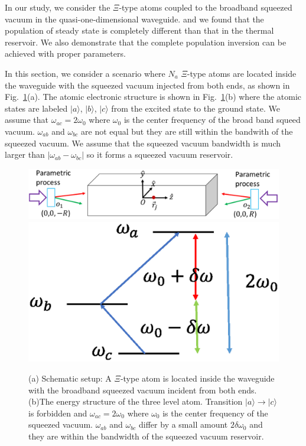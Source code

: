 \documentclass[aps,showpacs,twocolumn,twoside,groupedaddress]{revtex4}
\begin{document}
In our study, we consider the $\Xi$-type atoms coupled to the broadband squeezed vacuum in the quasi-one-dimensional waveguide. and we found that the population of steady state is completely different than that in the thermal reservoir. We also demonstrate that the complete population inversion can be achieved with proper parameters.


In this section, we consider a scenario where $N_a$ $\Xi$-type atoms are located inside the waveguide with the squeezed vacuum injected from both ends, as shown in Fig.~\ref{1}(a). The atomic electronic structure is shown in Fig.~\ref{1}(b) where the atomic states are labeled $|a\rangle$, $|b\rangle$, $|c\rangle$ from the excited state to the ground state. We assume that $\omega_{ac}=2\omega_0$ where $\omega_0$ is the center frequency of the broad band squeed vacuum.  $\omega_{ab}$ and $\omega_{bc}$ are not equal but they are still within the bandwith of the squeezed vacuum. We assume that the squeezed vacuum bandwidth is much larger than $|\omega_{ab}-\omega_{bc}|$ so it forms a squeezed vacuum reservoir. 
\begin{figure}
\includegraphics[width=1.5\columnwidth]{fig1.eps}
\includegraphics[width=0.5\columnwidth]{fig2.eps}
\caption{(a) Schematic setup: A $\Xi$-type atom is located inside the waveguide with the broadband squeezed vacuum incident from both ends. (b)The energy structure of the three level atom. Transition $|a\rangle\rightarrow|c\rangle$ is forbidden and $\omega_{ac}=2\omega_0$ where $\omega_0$ is the center frequency of the squeezed vacuum. $\omega_{ab}$ and $\omega_{bc}$ differ by a small amount $2\delta\omega_0$ and they are within the bandwidth of the squeezed vacuum reservoir.}
\label{1}
\end{figure}


\end{document}
